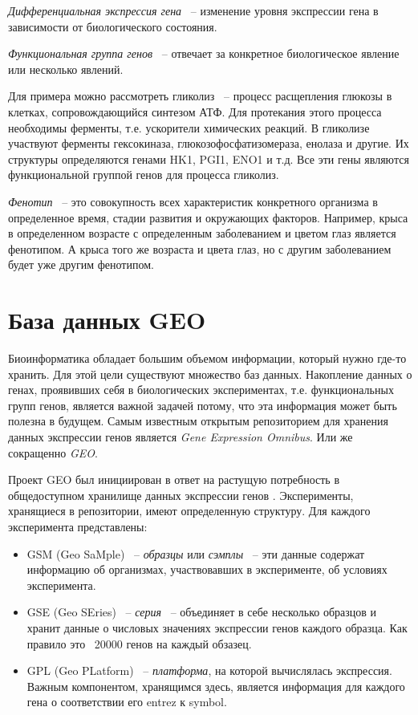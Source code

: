 \documentclass[times,specification,annotation]{itmo-student-thesis}
\begin{document}
\textit{Дифференциальная экспрессия гена} ~-- изменение уровня экспрессии гена в зависимости от биологического состояния.

\textit{Функциональная группа генов} ~-- отвечает за конкретное биологическое явление или несколько явлений. 

Для примера можно рассмотреть гликолиз ~-- процесс расщепления глюкозы в клетках, сопровождающийся синтезом АТФ. Для протекания этого процесса необходимы ферменты, т.е. ускорители химических реакций. В гликолизе участвуют ферменты гексокиназа, глюкозофосфатизомераза, енолаза и другие. Их структуры определяются генами HK1, PGI1, ENO1 \cite{Glycolysis} и т.д. Все эти гены являются функциональной группой генов для процесса гликолиз.

\textit{Фенотип} ~-- это совокупность всех характеристик конкретного организма в определенное время, стадии развития и окружающих факторов. Например, крыса в определенном возрасте с определенным заболеванием и цветом глаз является фенотипом. А крыса того же возраста и цвета глаз, но с другим заболеванием будет уже другим фенотипом. 

\section{База данных GEO}

Биоинформатика обладает большим объемом информации, который нужно где-то хранить. Для этой цели существуют множество баз данных. Накопление данных о генах, проявивших себя в биологических экспериментах, т.е. функциональных групп генов, является важной задачей потому, что эта информация может быть полезна в будущем. Самым известным открытым репозиторием для хранения данных экспрессии генов является \textit{Gene Expression Omnibus}. Или же сокращенно \textit{GEO}.

Проект GEO был инициирован в ответ на растущую потребность в общедоступном хранилище данных экспрессии генов \cite{GEO}. Эксперименты, хранящиеся в репозитории, имеют определенную структуру. Для каждого эксперимента представлены: 
\begin{itemize}
    \item GSM (Geo SaMple) ~-- \textit{образцы} или \textit{сэмплы} ~-- эти данные содержат информацию об организмах, участвовавших в эксперименте, об условиях эксперимента.
    \item GSE (Geo SEries) ~-- \textit{серия} ~-- объединяет в себе несколько образцов и хранит данные о числовых значениях экспрессии генов каждого образца. Как правило это ~20000 генов на каждый обзазец.
    \item GPL (Geo PLatform) ~-- \textit{платформа}, на которой вычислялась экспрессия. Важным компонентом, хранящимся здесь, является информация для каждого гена о соответствии его entrez к symbol.     
\end{itemize}
\end{document}
